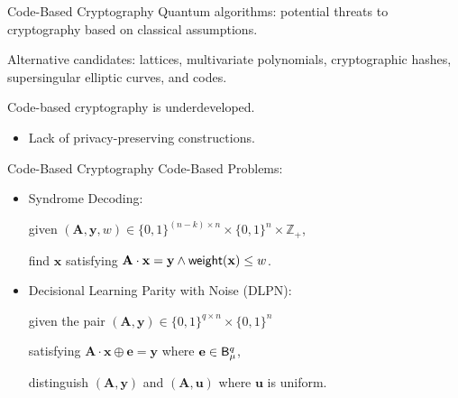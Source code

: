 \begin{frame}{Code-Based Cryptography}
	Quantum algorithms: potential threats to cryptography based on classical assumptions.\pause
	
	Alternative candidates: lattices, multivariate polynomials, cryptographic hashes, supersingular elliptic curves, and codes. \pause

	Code-based cryptography is underdeveloped.\pause
	\begin{itemize}
		\item Lack of privacy-preserving constructions.
	\end{itemize}
\end{frame}

\begin{frame}{Code-Based Cryptography}
	Code-Based Problems:\pause
	\begin{itemize}
		\item Syndrome Decoding: \pause
		
		given $(\mathbf{A}, \mathbf{y}, w) \in \{0,1\}^{(n - k)\times n}\times \{0,1\}^n\times \mathbb{Z}_+$,\pause
		
		find $\mathbf{x}$ satisfying $\mathbf{A}\cdot\mathbf{x} = \mathbf{y} \wedge \mathsf{weight}(\mathbf{x}) \leq w$.\pause
		
		\item Decisional Learning Parity with Noise (DLPN):\pause
		
		given the pair $(\mathbf{A}, \mathbf{y}) \in \{0,1\}^{q\times n}\times \{0,1\}^n$\pause
		
		satisfying $\mathbf{A}\cdot\mathbf{x}\oplus \mathbf{e} = \mathbf{y}$ where $\mathbf{e} \in \mathsf{B}_\mu^q$,\pause
		
		distinguish $(\mathbf{A}, \mathbf{y})$ and $(\mathbf{A}, \mathbf{u})$ where $\mathbf{u}$ is uniform.
	\end{itemize}
\end{frame}